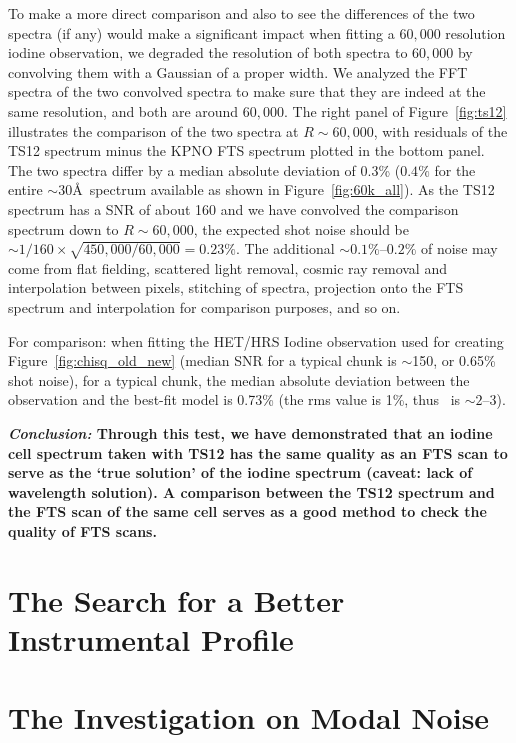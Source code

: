 To make a more direct comparison and also to see the differences of
the two spectra (if any) would make a significant impact when fitting
a $60,000$ resolution iodine observation, we degraded the resolution
of both spectra to $60,000$ by convolving them with a Gaussian of a
proper width. We analyzed the FFT spectra of the two convolved spectra
to make sure that they are indeed at the same resolution, and both are
around $60,000$. The right panel of Figure~\ref{fig:ts12} illustrates
the comparison of the two spectra at $R\sim60,000$, with residuals of
the TS12 spectrum minus the KPNO FTS spectrum plotted in the bottom
panel. The two spectra differ by a median absolute deviation of 0.3\%
($0.4\%$ for the entire $\sim$30\AA\ spectrum available as shown in
Figure~\ref{fig:60k_all}). As the TS12 spectrum has a SNR of about 160
and we have convolved the comparison spectrum down to $R\sim60,000$,
the expected shot noise should be $\sim 1/160\times
\sqrt{450,000/60,000}=0.23\%$. The additional $\sim 0.1\%$--$0.2\%$ of
noise may come from flat fielding, scattered light removal, cosmic ray
removal and interpolation between pixels, stitching of spectra,
projection onto the FTS spectrum and interpolation for comparison
purposes, and so on.

For comparison: when fitting the HET/HRS Iodine observation used for
creating Figure~\ref{fig:chisq_old_new} (median SNR for a typical
chunk is $\sim$150, or 0.65\% shot noise), for a typical chunk, the
median absolute deviation between the observation and the best-fit
model is 0.73\% (the rms value is 1\%, thus \chisq\ is $\sim 2$--$3$).


\textbf{\textit{Conclusion:} Through this test, we have demonstrated that an
  iodine cell spectrum taken with TS12 has the same quality as an FTS
  scan to serve as the `true solution' of the iodine spectrum (caveat:
  lack of wavelength solution). A comparison between the TS12 spectrum
  and the FTS scan of the same cell serves as a good method to check
  the quality of FTS scans.}




\section{The Search for a Better Instrumental Profile}\label{het:sec:ip}


\section{The Investigation on Modal Noise}
  
